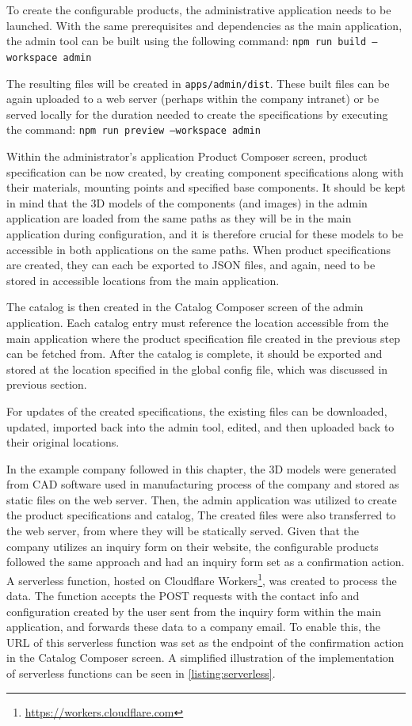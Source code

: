 To create the configurable products, the administrative application needs to be launched. With the same prerequisites and dependencies as the main application, the admin tool can be built using the following command: \linebreak\texttt{npm run build --workspace admin}

The resulting files will be created in \texttt{apps/admin/dist}. These built files can be again uploaded to a web server (perhaps within the company intranet) or be served locally for the duration needed to create the specifications by executing the command: \texttt{npm run preview --workspace admin}

Within the administrator's application Product Composer screen, product specification can be now created, by creating component specifications along with their materials, mounting points and specified base components. It should be kept in mind that the 3D models of the components (and images) in the admin application are loaded from the same paths as they will be in the main application during configuration, and it is therefore crucial for these models to be accessible in both applications on the same paths. When product specifications are created, they can each be exported to JSON files, and again, need to be stored in accessible locations from the main application.

The catalog is then created in the Catalog Composer screen of the admin application. Each catalog entry must reference the location accessible from the main application where the product specification file created in the previous step can be fetched from. After the catalog is complete, it should be exported and stored at the location specified in the global config file, which was discussed in previous section.

For updates of the created specifications, the existing files can be downloaded, updated, imported back into the admin tool, edited, and then uploaded back to their original locations.

In the example company followed in this chapter, the 3D models were generated from CAD software used in manufacturing process of the company and stored as static files on the web server. Then, the admin application was utilized to create the product specifications and catalog, The created files were also transferred to the web server, from where they will be statically served. Given that the company utilizes an inquiry form on their website, the configurable products followed the same approach and had an inquiry form set as a confirmation action. A serverless function, hosted on Cloudflare Workers\footnote{\url{https://workers.cloudflare.com}}, was created to process the data. The function accepts the POST requests with the contact info and configuration created by the user sent from the inquiry form within the main application, and forwards these data to a company email. To enable this, the URL of this serverless function was set as the endpoint of the confirmation action in the Catalog Composer screen. A simplified illustration of the implementation of serverless functions can be seen in \autoref{listing:serverless}.

